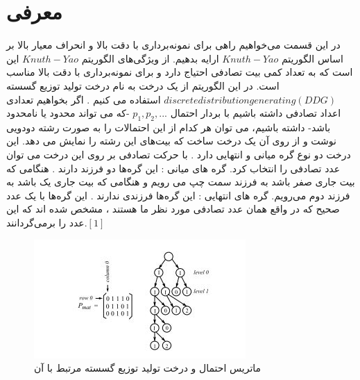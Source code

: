 \section{معرفی}
در این قسمت می‌خواهیم راهی برای نمونه‌برداری با دقت بالا و انحراف معیار بالا بر اساس الگوریتم $Knuth-Yao$ ارایه بدهیم. از ویژگی‌های الگوریتم $Knuth-Yao$ این است که به تعداد کمی بیت تصادفی احتیاج دارد و برای نمونه‌برداری با دقت بالا مناسب است.  
در این الگوریتم از یک درخت به نام درخت تولید توزیع گسسته  $discrete distribution generating (DDG)$   استفاده می کنیم . 
اگر  بخواهیم تعدادی اعداد  تصادفی داشته باشیم با بردار احتمال $p_{1}, p_{2}, ...$ -که می تواند محدود یا نامحدود باشد- داشته باشیم، می توان هر کدام از این احتمالات را به صورت رشته دودویی نوشت و از روی آن یک درخت ساخت که بیت‌های این رشته را نمایش می دهد. این درخت دو نوع گره میانی و انتهایی دارد . با حرکت تصادفی بر روی این درخت می توان عدد تصادفی را انتخاب کرد. 
 گره های میانی : این گره‌ها دو فرزند دارند . هنگامی که بیت جاری صفر باشد به فرزند سمت چپ می رویم و هنگامی که بیت جاری یک باشد به فرزند دوم می‌رویم. 
 گره های انتهایی : این گره‌ها فرزندی ندارند . این گره‌ها با یک عدد صحیح  که در واقع همان عدد تصادفی مورد نظر ما هستند ، مشخص شده اند که این عدد را برمی‌گردانند.$[1]$

      \begin{figure}[!htb]
      	\includegraphics[width=\linewidth]{images/Knuth-Yao-Pmat}
      	\caption{ماتریس احتمال و درخت تولید توزیع گسسته مرتبط با آن}\label{fig:logtonemap}
      	\endminipage\hfill
      \end{figure}
      
